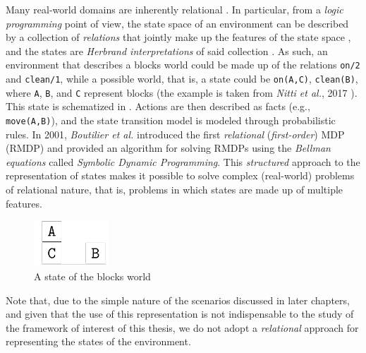 Many real-world domains are inherently relational \cite{Nitti2017}. In particular, from a \textit{logic programming} point of view, the state space of an environment can be described by a collection of \textit{relations} that jointly make up the features of the state space \cite{bout2, rrmdp}, and the states are \textit{Herbrand interpretations} of said collection \cite{relationallogic}. As such, an environment that describes a blocks world could be made up of the relations \texttt{on/2} and \texttt{clean/1}, while a possible world, that is, a state could be \texttt{on(A,C)}, \texttt{clean(B)}, where \texttt{A}, \texttt{B}, and \texttt{C} represent blocks (the example is taken from \textit{Nitti et al.}, 2017 \cite{Nitti2017}). This state is schematized in . Actions are then described as facts (e.g., \texttt{move(A,B)}), and the state transition model is modeled through probabilistic rules. In 2001, \textit{Boutilier et al.} \cite{bout2} introduced the first \textit{relational} (\textit{first-order}) MDP (RMDP) and provided an algorithm for solving RMDPs using the \textit{Bellman equations} called \textit{Symbolic Dynamic Programming}. This \textit{structured} approach to the representation of states makes it possible to solve complex (real-world) problems of relational nature, that is, problems in which states are made up of multiple features.




\begin{figure}[h]
\centering
    \includegraphics[width=0.25\textwidth]{images/MasterThesisRelationalDraw.pdf}
  \caption{A state of the blocks world}
  \label{fig:block}
\end{figure}


Note that, due to the simple nature of the scenarios discussed in later chapters, and given that the use of this representation is not indispensable to the study of the framework of interest of this thesis, we do not adopt a \textit{relational} approach for representing the states of the environment.